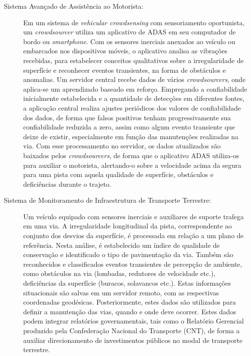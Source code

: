 \begin{description}
\item [Sistema Avançado de Assistência ao Motorista:] Em um sistema de \textit{vehicular crowdsensing} com sensoriamento oportunista, um \textit{crowdsourcer} utiliza um aplicativo de ADAS em seu computador de bordo ou \textit{smartphone}. Com os sensores inerciais anexados ao veículo ou embarcados nos dispositivos móveis, o aplicativo analisa as vibrações recebidas, para estabelecer conceitos qualitativos sobre a irregularidade de superfície e reconhecer eventos transientes, na forma de obstáculos e anomalias. Um servidor central recebe dados de vários \textit{crowdsourcers}, onde aplica-se um aprendizado baseado em reforço. Empregando a confiabilidade inicialmente estabelecida e a quantidade de detecções em diferentes fontes, a aplicação central realiza ajustes periódicos dos valores de confiabilidade dos dados, de forma que falsos positivos tenham progressivamente sua confiabilidade reduzida a zero, assim como algum evento transiente que deixe de existir, especialmente em função das manutenções realizadas na via. Com esse processamento no servidor, os dados atualizados são baixados pelos \textit{crowdsourcers}, de forma que o aplicativo ADAS utiliza-os para auxiliar o motorista, alertando-o sobre a velocidade acima da segura para uma pista com aquela qualidade de superfície, obstáculos e deficiências durante o trajeto.

\item [Sistema de Monitoramento de Infraestrutura de Transporte Terrestre:] Um veículo e\-qui\-pa\-do com sensores inerciais e auxiliares de suporte trafega em uma via. A irregularidade longitudinal da pista, correspondente ao conjunto dos desvios da superfície, é processada em relação a um plano de referência. Nesta análise, é estabelecido um índice de qualidade de conservação e identificado o tipo de pavimentação da via. Também são reconhecidos e classificados eventos transientes de percepção de ambiente, como obstáculos na via (lombadas, redutores de velocidade etc.), deficiências da superfície (buracos, solavancos etc.). Estas informações situacionais são salvas em um servidor remoto, com as respectivas coordenadas geodésicas. Posteriormente, estes dados são utilizados para definir a manutenção das vias, quando e onde deve ocorrer. Estes dados podem integrar relatórios governamentais, tais como o Relatório Gerencial produzido pela Confederação Nacional do Transporte (CNT), de forma a auxiliar direcionamento de investimentos públicos no modal de transporte terrestre.

\end{description}


